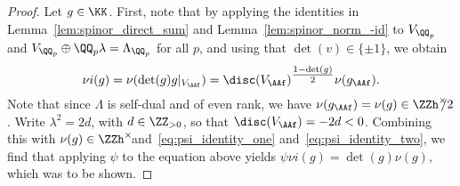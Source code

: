 \begin{proof}
%
%
    Let $g \in {\KK}$. First, note that by applying the identities in Lemma~\ref{lem:spinor_direct_sum} and Lemma~\ref{lem:spinor_norm_-id} to $V_{\QQ_p}$ and $V_{\QQ_p} \oplus \QQ_p \lambda = \Lambda_{\QQ_p}$ for all $p$, and using that $\det(v) \in \{\pm 1\}$, we obtain
$$
    \nu i (g) = \nu(\det(g) g|_{V_{\AAf}}) = \disc(V_{\AAf})^{\tfrac{1 - \det(g)}{2}} \nu(g_{\AAf}).
$$
    Note that since $\Lambda$ is self-dual and of even rank, we have $\nu(g_{\AAf}) = \nu(g) \in \ZZh^{\times}\hspace{-5pt}/2$. Write $\lambda^2 = 2d$, with $d \in \ZZ_{> 0}$, so that $\disc(V_{\AAf}) = -2d < 0$. Combining this with $\nu(g) \in \ZZh^{\times}\hspace{-5pt}$ and~\eqref{eq:psi_identity_one} and~\eqref{eq:psi_identity_two}, we find that applying $\psi$ to the equation above yields $\psi \nu i(g) = \det(g) \nu(g)$, which was to be shown.
\end{proof}

